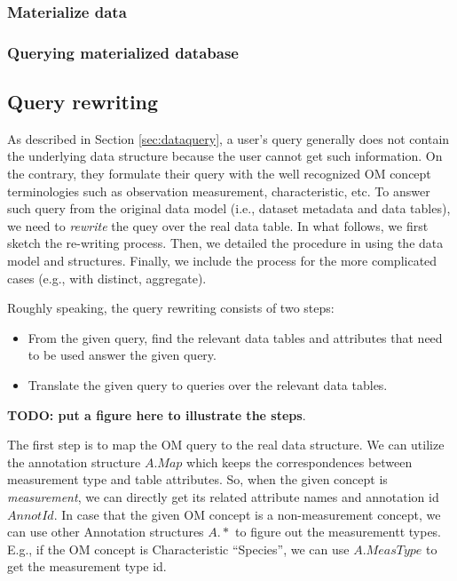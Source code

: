 \documentclass[conference]{IEEEtran}
\begin{document}
\subsubsection{Materialize data}

\subsubsection{Querying materialized database}



\subsection{Query rewriting}\label{sec:queryrewrite}

As described in Section \ref{sec:dataquery}, 
a user's query generally does not contain the underlying data
structure because the user cannot get such information. 
On the contrary, they formulate their query with the well recognized
OM concept terminologies such as observation
measurement, characteristic, etc. 
To answer such query from the original data model (i.e., dataset
metadata and data tables), we need to {\em rewrite} the quey over the
real data table. 
In what follows, we first sketch the re-writing process. Then, we
detailed the procedure in using the data model and
structures. Finally, we include the process for the more complicated
cases (e.g., with distinct, aggregate). 

Roughly speaking, the query rewriting consists of two steps:
\begin{itemize}
\item From the given query, find the relevant data tables and
  attributes that need to be used answer the given query. 
\item Translate the given query to queries over the relevant data
  tables. 
\end{itemize}

{\bf TODO: put a figure here to illustrate the steps}. 

The first step is to map the OM query to the real data structure. 
We can utilize the annotation structure $A.Map$ which keeps the correspondences between
measurement type and table attributes. 
So, when the given concept is {\em measurement}, we can directly get
its related attribute names and annotation id $AnnotId$. 
In case that the given OM concept is a non-measurement concept, we can use
other Annotation structures $A.*$ to figure out the measurementt types. 
E.g., if the OM concept is Characteristic ``Species'', we can use
$A.MeasType$ to get the measurement type id. 
\end{document}
